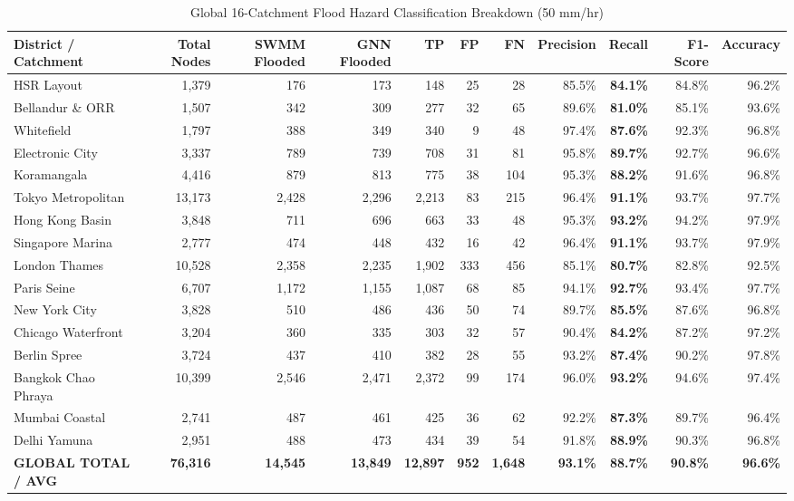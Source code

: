 \documentclass[conference]{IEEEtran}
\begin{document}
\begin{table}[t]
\caption{Global 16-Catchment Flood Hazard Classification Breakdown (50 mm/hr)}
\label{tab:global_classification}
\centering
\small
\begin{tabular}{lrrrrrrrrrr}
\toprule
\textbf{District / Catchment} & \textbf{Total Nodes} & \textbf{SWMM Flooded} & \textbf{GNN Flooded} & \textbf{TP} & \textbf{FP} & \textbf{FN} & \textbf{Precision} & \textbf{Recall} & \textbf{F1-Score} & \textbf{Accuracy} \\
\midrule
HSR Layout & 1,379 & 176 & 173 & 148 & 25 & 28 & 85.5\% & \textbf{84.1\%} & 84.8\% & 96.2\% \\
Bellandur \& ORR & 1,507 & 342 & 309 & 277 & 32 & 65 & 89.6\% & \textbf{81.0\%} & 85.1\% & 93.6\% \\
Whitefield & 1,797 & 388 & 349 & 340 & 9 & 48 & 97.4\% & \textbf{87.6\%} & 92.3\% & 96.8\% \\
Electronic City & 3,337 & 789 & 739 & 708 & 31 & 81 & 95.8\% & \textbf{89.7\%} & 92.7\% & 96.6\% \\
Koramangala & 4,416 & 879 & 813 & 775 & 38 & 104 & 95.3\% & \textbf{88.2\%} & 91.6\% & 96.8\% \\
Tokyo Metropolitan & 13,173 & 2,428 & 2,296 & 2,213 & 83 & 215 & 96.4\% & \textbf{91.1\%} & 93.7\% & 97.7\% \\
Hong Kong Basin & 3,848 & 711 & 696 & 663 & 33 & 48 & 95.3\% & \textbf{93.2\%} & 94.2\% & 97.9\% \\
Singapore Marina & 2,777 & 474 & 448 & 432 & 16 & 42 & 96.4\% & \textbf{91.1\%} & 93.7\% & 97.9\% \\
London Thames & 10,528 & 2,358 & 2,235 & 1,902 & 333 & 456 & 85.1\% & \textbf{80.7\%} & 82.8\% & 92.5\% \\
Paris Seine & 6,707 & 1,172 & 1,155 & 1,087 & 68 & 85 & 94.1\% & \textbf{92.7\%} & 93.4\% & 97.7\% \\
New York City & 3,828 & 510 & 486 & 436 & 50 & 74 & 89.7\% & \textbf{85.5\%} & 87.6\% & 96.8\% \\
Chicago Waterfront & 3,204 & 360 & 335 & 303 & 32 & 57 & 90.4\% & \textbf{84.2\%} & 87.2\% & 97.2\% \\
Berlin Spree & 3,724 & 437 & 410 & 382 & 28 & 55 & 93.2\% & \textbf{87.4\%} & 90.2\% & 97.8\% \\
Bangkok Chao Phraya & 10,399 & 2,546 & 2,471 & 2,372 & 99 & 174 & 96.0\% & \textbf{93.2\%} & 94.6\% & 97.4\% \\
Mumbai Coastal & 2,741 & 487 & 461 & 425 & 36 & 62 & 92.2\% & \textbf{87.3\%} & 89.7\% & 96.4\% \\
Delhi Yamuna & 2,951 & 488 & 473 & 434 & 39 & 54 & 91.8\% & \textbf{88.9\%} & 90.3\% & 96.8\% \\
\midrule
\textbf{GLOBAL TOTAL / AVG} & \textbf{76,316} & \textbf{14,545} & \textbf{13,849} & \textbf{12,897} & \textbf{952} & \textbf{1,648} & \textbf{93.1\%} & \textbf{88.7\%} & \textbf{90.8\%} & \textbf{96.6\%} \\
\bottomrule
\end{tabular}
\end{table}
\end{document}
